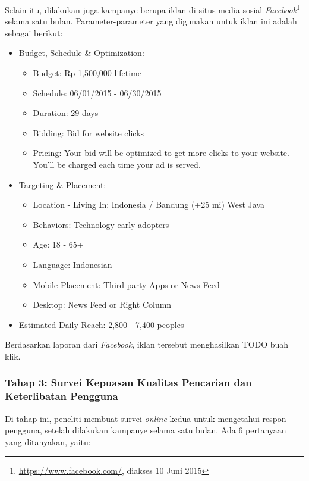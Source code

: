 Selain itu, dilakukan juga kampanye berupa iklan di situs media sosial \textit{Facebook}\footnote{\url{https://www.facebook.com/}, diakses 10 Juni 2015} selama satu bulan. Parameter-parameter yang digunakan untuk iklan ini adalah sebagai berikut:

\begin{itemize}
	\item Budget, Schedule \& Optimization:
	\begin{itemize}
		\item Budget: Rp 1,500,000 lifetime
		\item Schedule: 06/01/2015 - 06/30/2015
		\item Duration: 29 days
		\item Bidding: Bid for website clicks
		\item Pricing: Your bid will be optimized to get more clicks to your website. You'll be charged each time your ad is served.
	\end{itemize}
	\item Targeting \& Placement:
	\begin{itemize}
		\item Location - Living In: Indonesia / Bandung (+25 mi) West Java
		\item Behaviors: Technology early adopters
		\item Age: 18 - 65+
		\item Language: Indonesian
		\item Mobile Placement: Third-party Apps or News Feed
		\item Desktop: News Feed or Right Column
	\end{itemize}
	\item Estimated Daily Reach: 2,800 - 7,400 peoples
\end{itemize}

Berdasarkan laporan dari \textit{Facebook}, iklan tersebut menghasilkan TODO buah klik.

\subsubsection{Tahap 3: Survei Kepuasan Kualitas Pencarian dan Keterlibatan Pengguna}

Di tahap ini, peneliti membuat survei \textit{online} kedua untuk mengetahui respon pengguna, setelah dilakukan kampanye selama satu bulan. Ada 6 pertanyaan yang ditanyakan, yaitu:

